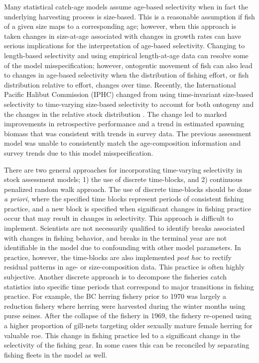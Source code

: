 \documentclass[review,letterpaper,10pt,authoryear]{elsarticle}
\begin{document}
Many statistical catch-age models assume age-based selectivity when in fact the underlying harvesting process is size-based. This is a reasonable assumption if fish of a given size maps to a corresponding age; however, when this approach is taken changes in size-at-age associated with changes in growth rates can have serious implications for the interpretation of age-based selectivity. Changing to length-based selectivity and using empirical length-at-age data can resolve some of the model misspecification; however, ontogentic movement of fish can also lead to changes in age-based selectivity when the distribution of fishing effort, or fish distribution relative to effort, changes over time.  Recently, the International Pacific Halibut Commission (IPHC) changed from using time-invariant size-based selectivity to time-varying size-based selectivity to account for both ontogeny and the changes in the relative stock distribution 
\citep{stewart2012assessment}.  The change led to marked improvements in retrospective performance and a trend in estimated spawning biomass that was consistent with trends in survey data.  The previous assessment model was unable to consistently match the age-composition information and survey trends due to this model misspecification.

There are two general approaches for incorporating time-varying selectivity in stock assessment models; 1) the use of discrete time-blocks, and 2) continuous penalized random walk approach.  The use of discrete time-blocks should be done \emph{a priori}, where the specified time blocks represent periods of consistent fishing practice, and a new block is specified when significant changes in fishing practice occur that may result in changes in selectivity. This approach is difficult to implement.  Scientists are not necessarily qualified to identify breaks associated with changes in fishing behavior, and breaks in the terminal year are not identifiable in the model due to confounding with other model parameters. In practice, however, the time-blocks are also implemented \emph{post hoc} to rectify residual patterns in age- or size-composition data. This practice is often highly subjective.  Another discrete approach is to decompose the fisheries catch statistics into specific time periods that correspond to major transitions in fishing practice.  For example, the BC herring fishery prior to 1970 was largely a reduction fishery where herring were harvested during the winter months using purse seines.  After the collapse of the fishery in 1969, the fishery re-opened using a higher proportion of gill-nets targeting older sexually mature female herring for valuable roe.  This change in fishing practice led to a significant change in the selectivity of the fishing gear.  In some cases this can be reconciled by separating fishing fleets in the model as well.
\end{document}
